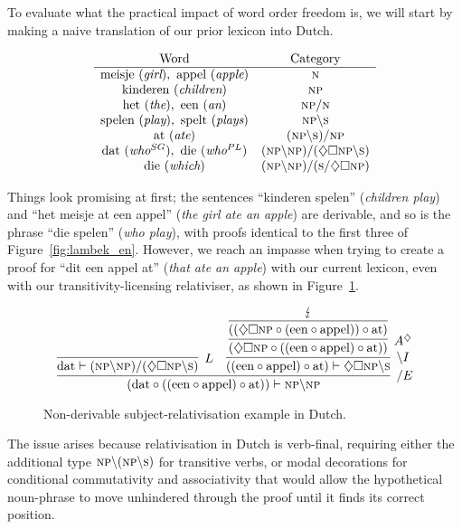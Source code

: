 To evaluate what the practical impact of word order freedom is, we will start by making a naive translation of our prior lexicon into Dutch.

 \[
 \begin{array}{cc}
 \text{Word} & \text{Category} \\
 \hline
 \text{meisje}\ (\textit{girl}), \ \text{appel} \ (\textit{apple}) & \textsc{n} \\
 \text{kinderen} \ (\textit{children}) & \textsc{np} \\
 \text{het} \ (\textit{the}) , \ \text{een} \ (\textit{an}) & \textsc{np}/ \textsc{n} \\
 \text{spelen} \ (\textit{play}), \ \text{spelt} \ (\textit{plays}) & \textsc{np}\backslash \textsc{s} \\
 \text{at} \ (\textit{ate}) & (\textsc{np} \backslash \textsc{s}) / \textsc{np} \\ 
 \text{dat} \ (\textit{who$^{SG}$}), \ \text{die} \ (\textit{who$^{PL}$}) & (\textsc{np} \backslash \textsc{np}) / (\diamondsuit \Box \textsc{np} \backslash \textsc{s}) \\
 \text{die} \ (\textit{which}) & (\textsc{np} \backslash \textsc{np})/(\textsc{s} / \diamondsuit \Box \textsc{np})
 \end{array}
 \]

Things look promising at first; the sentences ``kinderen spelen'' (\textit{children play}) and ``het meisje at een appel''  (\textit{the girl ate an apple}) are derivable, and so is the phrase ``die spelen'' (\textit{who play}), with proofs identical to the first three of Figure~\ref{fig:lambek_en}.
However, we reach an impasse when trying to create a proof for ``dit een appel at'' (\textit{that ate an apple}) with our current lexicon, even with our transitivity-licensing relativiser, as shown in Figure~\ref{fig:nl_dutch}.
\begin{figure}
	\centering
		\[
		\infer[/E]{(\text{dat} \circ ((\text{een} \circ \text{appel}) \circ \text{at})) \vdash \textsc{np}\backslash \textsc{np}}{
			\infer[L]{\text{dat} \vdash (\textsc{np} \backslash \textsc{np}) / (\diamondsuit \Box \textsc{np} \backslash \textsc{s})}{}
			&
			\infer[\backslash I]{((\text{een} \circ \text{appel}) \circ \text{at}) \vdash \diamondsuit \Box \textsc{np}\backslash \textsc{s}}{
				\infer[A^\diamondsuit]{(\diamondsuit \Box \textsc{np} \circ ((\text{een} \circ \text{appel}) \circ \text{at}))}{
					\infer[]{((\diamondsuit \Box \textsc{np} \circ (\text{een} \circ \text{appel})) \circ \text{at})}{\lightning}
				}
			}
		}
		\]
\caption[Failing NL Derivation]{Non-derivable subject-relativisation example in Dutch.}
\label{fig:nl_dutch}
\end{figure}
The issue arises because relativisation in Dutch is verb-final, requiring either the additional type $\textsc{np}\backslash(\textsc{np}\backslash\textsc{s})$ for transitive verbs, or modal decorations for conditional commutativity and associativity that would allow the hypothetical noun-phrase to move unhindered through the proof until it finds its correct position.


